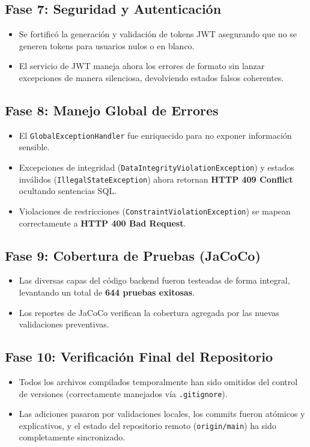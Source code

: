 \documentclass[12pt,a4paper]{article}
\begin{document}
\subsection{Fase 7: Seguridad y Autenticación}
\begin{itemize}
    \item Se fortificó la generación y validación de tokens JWT asegurando que no se generen tokens para usuarios nulos o en blanco.
    \item El servicio de JWT maneja ahora los errores de formato sin lanzar excepciones de manera silenciosa, devolviendo estados falsos coherentes.
\end{itemize}

\subsection{Fase 8: Manejo Global de Errores}
\begin{itemize}
    \item El \texttt{GlobalExceptionHandler} fue enriquecido para no exponer información sensible.
    \item Excepciones de integridad (\texttt{DataIntegrityViolationException}) y estados inválidos (\texttt{IllegalStateException}) ahora retornan \textbf{HTTP 409 Conflict} ocultando sentencias SQL.
    \item Violaciones de restricciones (\texttt{ConstraintViolationException}) se mapean correctamente a \textbf{HTTP 400 Bad Request}.
\end{itemize}

\subsection{Fase 9: Cobertura de Pruebas (JaCoCo)}
\begin{itemize}
    \item Las diversas capas del código backend fueron testeadas de forma integral, levantando un total de \textbf{644 pruebas exitosas}.
    \item Los reportes de JaCoCo verifican la cobertura agregada por las nuevas validaciones preventivas.
\end{itemize}

\subsection{Fase 10: Verificación Final del Repositorio}
\begin{itemize}
    \item Todos los archivos compilados temporalmente han sido omitidos del control de versiones (correctamente manejados vía \texttt{.gitignore}).
    \item Las adiciones pasaron por validaciones locales, los commits fueron atómicos y explicativos, y el estado del repositorio remoto (\texttt{origin/main}) ha sido completamente sincronizado.
\end{itemize}
\end{document}
